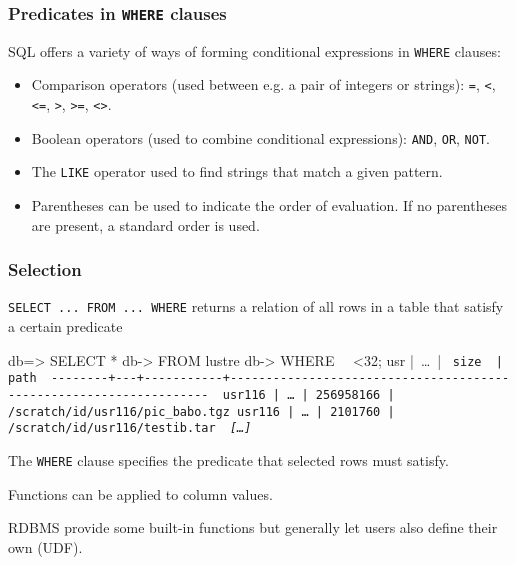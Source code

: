 \documentclass[english,serif,mathserif]{beamer}
\begin{document}
\begin{frame}
  \frametitle{Predicates in \texttt{WHERE} clauses}
  SQL offers a variety of ways of forming conditional expressions in
  \texttt{WHERE} clauses:

  \+
  \begin{itemize}
  \item Comparison operators (used between e.g. a pair of integers or strings):
    \texttt{=}, \texttt{<}, \texttt{<=}, \texttt{>}, \texttt{>=}, \texttt{<>}.
  \item Boolean operators (used to combine conditional expressions):
    \texttt{AND}, \texttt{OR}, \texttt{NOT}.
  \item The \texttt{LIKE} operator used to find strings that match a given
    pattern.
  \item Parentheses can be used to indicate the order of evaluation. If no
    parentheses are present, a standard order is used.
  \end{itemize}
\end{frame}

\begin{frame}[fragile]
  \frametitle{Selection}

  \texttt{SELECT ... FROM ... WHERE} returns a relation of all rows in a table
  that satisfy a certain predicate

  \+
\begin{sql}[basicstyle=\ttfamily\tiny]
db=> SELECT *
db-> FROM lustre
db-> WHERE ~~<32;
  usr   |~\ldots~|   ~\tt size~    | path
~-{}-{}-{}-{}-{}-{}-{}-{}+{}-{}-{}-{}+{}-{}-{}-{}-{}-{}-{}-{}-{}-{}-{}-{}+{}-{}-{}-{}-{}-{}-{}-{}-{}-{}-{}-{}-{}-{}-{}-{}-{}-{}-{}-{}-{}-{}-{}-{}-{}-{}-{}-{}-{}-{}-{}-{}-{}-{}-{}-{}-{}-{}-{}-{}-{}-{}-{}-{}-{}-{}-{}-{}-{}-{}-{}-{}-{}-{}-{}-{}-{}-{}-{}-{}-{}-{}-{}-{}-{}-{}-{}-{}~
 usr116 |~\ldots~| 256958166 | /scratch/id/usr116/pic_babo.tgz
 usr116 |~\ldots~|   2101760 | /scratch/id/usr116/testib.tar
 ~{\em [\ldots]}~
\end{sql}

The \texttt{WHERE} clause specifies the predicate that selected rows must
satisfy.

\+ Functions can be applied to column values.

\+ RDBMS provide some built-in functions but generally let users also define
their own (UDF).
\end{frame}


\end{document}
